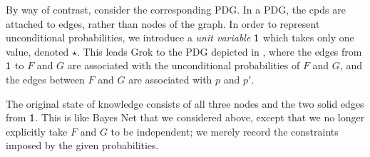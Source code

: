 \documentclass{article}
\begin{document}
\begin{example}
By way of contrast, consider the corresponding PDG. In a PDG, the cpds are
attached to edges, rather than nodes of the graph.
%
In order to represent unconditional probabilities, we introduce
a \emph{unit variable} $\mathsf{1}$ which 
takes only one value, denoted
$\star$. 
This leads Grok to 
the PDG depicted in ,
where the edges from $\mathsf{1}$ to $F$ and $G$ are associated with the
unconditional probabilities of $F$ and $G$, and the 
edges between $F$ and $G$ are associated with $p$ and $p'$.



The original state of knowledge consists of all three nodes and the two
solid
edges from $\mathsf{1}$. This is like Bayes Net that we considered above,
except that we 
no longer
explicitly
%
take  $F$ and $G$ to be independent; we merely record the constraints
imposed by the given probabilities.  
	

\end{example}
\end{document}
